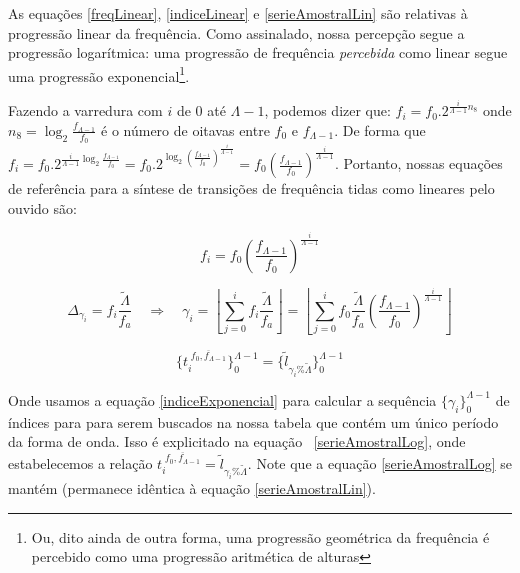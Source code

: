 As equações \ref{freqLinear}, \ref{indiceLinear} e \ref{serieAmostralLin} são relativas à progressão linear
da frequência. Como assinalado, nossa percepção segue a progressão logarítmica:
uma progressão de frequência
\emph{percebida} como linear segue uma progressão exponencial\footnote{Ou,
dito ainda de outra forma, uma progressão geométrica da frequência
é percebido como uma progressão aritmética de alturas}.

Fazendo a varredura com $i$
de $0$ até $\Lambda-1$, podemos dizer que: $f_i=f_0 . 2^{\frac{i}{\Lambda-1} n_8}$ onde 
$n_8=\log_2\frac{f_{\Lambda-1}}{f_0}$ é o número de oitavas entre $f_0$ e $f_{\Lambda-1}$.
De forma que $f_i=f_0 . 2^{\frac{i}{\Lambda-1}\log_2\frac{f_{\Lambda-1}}{f_0}}=
f_0 . 2^{\log_2\left ( \frac{f_{\Lambda-1}}{f_0} \right )^{\frac{i}{\Lambda-1}}}=
f_0 \left ( \frac{f_{\Lambda-1}}{f_0} \right ) ^{\frac{i}{\Lambda -1}}$. Portanto,
nossas equações de referência para a síntese de transições de frequência tidas como
lineares pelo ouvido são:

\begin{equation}
f_i=f_0 \left ( \frac{f_{\Lambda-1}}{f_0} \right ) ^{\frac{i}{\Lambda -1}}
\end{equation}

\begin{equation}\label{indiceExponencial}
\Delta_{\gamma_i}=f_i\frac{\widetilde{\Lambda}}{f_a} \quad \Rightarrow \quad \gamma_i=\left \lfloor \sum_{j=0}^{i} f_i\frac{\widetilde{\Lambda}}{f_a} \right \rfloor   =\left \lfloor \sum_{j=0}^{i} f_0 \frac{\widetilde{\Lambda}}{f_a} \left ( \frac{f_{\Lambda-1}}{f_0} \right ) ^{\frac{i}{\Lambda -1}} \right \rfloor
\end{equation}

\begin{equation}\label{serieAmostralLog}
\{t_i^{\;\overline{f_0,f_{\Lambda-1}}}\}_0^{\Lambda-1}=\{\widetilde{l}_{\gamma_i \% \widetilde{\Lambda}}\}_0^{\Lambda-1}
\end{equation}

Onde usamos a equação \ref{indiceExponencial} para calcular a sequência $\{\gamma_i\}_0^{\Lambda-1}$ de índices para para
serem buscados na nossa tabela que contém um único período da forma de onda.
Isso é explicitado na equação ~\ref{serieAmostralLog}, onde estabelecemos a relação
 $t_i^{\;\overline{f_0,f_{\Lambda-1}}}=\widetilde{l}_{\gamma_i \% \widetilde{\Lambda}}$.
Note que a equação \ref{serieAmostralLog} se mantém (permanece idêntica à equação \ref{serieAmostralLin}).

